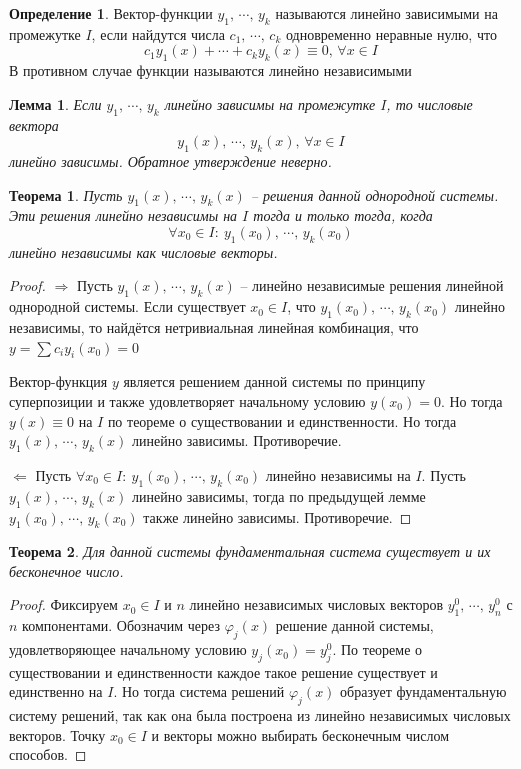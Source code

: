 \documentclass[a4paper,12pt]{article}
\renewcommand{\phi}{\ensuremath{\varphi}}
\theoremstyle{plain}
\newtheorem{theorem}{Теорема}[section]
\newtheorem{lemma}{Лемма}[section]
\theoremstyle{definition}
\newtheorem{definition}{Определение}[section]
\theoremstyle{remark}
\begin{document}
\begin{definition}
	Вектор-функции $y_1,\,\cdots,\,y_k$ называются линейно зависимыми на промежутке $I$, если найдутся числа $c_1,\,\cdots,\,c_k$ одновременно неравные нулю, что
	\[c_1y_1(x) + \cdots + c_ky_k(x) \equiv 0,\, \forall x \in I\]
	В противном случае функции называются линейно независимыми
\end{definition}

\begin{lemma}
	Если $y_1,\,\cdots,\,y_k$ линейно зависимы на промежутке $I$, то числовые вектора
	\[y_1(x),\,\cdots,\,y_k(x),\, \forall x \in I\]
	линейно зависимы. Обратное утверждение неверно.
\end{lemma}

\begin{theorem}
	Пусть $y_1(x),\,\cdots,\,y_k(x)$ -- решения данной однородной системы. Эти решения линейно независимы на $I$ тогда и только тогда, когда
	\[\forall x_0 \in I:\: y_1(x_0),\,\cdots,\,y_k(x_0)\]
	линейно независимы как числовые векторы.
\end{theorem}

\begin{proof}
	$\Rightarrow$ Пусть $y_1(x),\,\cdots,\,y_k(x)$ -- линейно независимые решения линейной однородной системы. Если существует $x_0 \in I$, что $y_1(x_0),\,\cdots,\,y_k(x_0)$ линейно независимы, то найдётся нетривиальная линейная комбинация, что $y = \sum c_iy_i(x_0) = 0$

	Вектор-функция $y$ является решением данной системы по принципу суперпозиции и также удовлетворяет начальному условию $y(x_0) = 0$. Но тогда $y(x) \equiv 0$ на $I$ по теореме о существовании и единственности. Но тогда $y_1(x),\,\cdots,\,y_k(x)$ линейно зависимы. Противоречие.

	$\Leftarrow$ Пусть $\forall x_0 \in I:\: y_1(x_0),\,\cdots,\,y_k(x_0)$ линейно независимы на $I$. Пусть $y_1(x),\,\cdots,\,y_k(x)$ линейно зависимы, тогда по предыдущей лемме $y_1(x_0),\,\cdots,\,y_k(x_0)$ также линейно зависимы. Противоречие.
\end{proof}

\begin{theorem}
	Для данной системы фундаментальная система существует и их бесконечное число.
\end{theorem}

\begin{proof}
	Фиксируем $x_0 \in I$ и $n$ линейно независимых числовых векторов $y_1^0,\,\cdots,\,y_n^0$ с $n$ компонентами. Обозначим через $\phi_j(x)$ решение данной системы, удовлетворяющее начальному условию $y_j(x_0) = y_j^0$. По теореме о существовании и единственности каждое такое решение существует и единственно на $I$. Но тогда система решений $\phi_j(x)$ образует фундаментальную систему решений, так как она была построена из линейно независимых числовых векторов. Точку $x_0 \in I$ и векторы можно выбирать бесконечным числом способов.
\end{proof}
\end{document}
